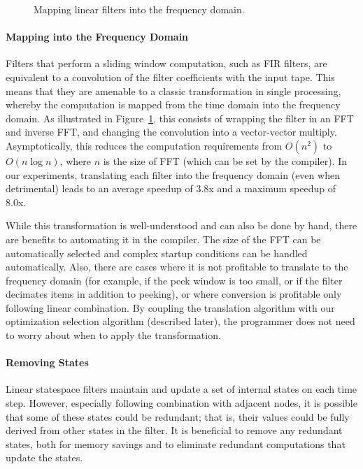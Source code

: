 \begin{figure}[t]
\caption{Mapping linear filters into the frequency domain.\protect\label{fig:freq}}
\end{figure}

\paragraph*{Mapping into the Frequency Domain}  Filters that perform a 
sliding window computation, such as FIR filters, are equivalent to a
convolution of the filter coefficients with the input tape.  This
means that they are amenable to a classic transformation in single
processing, whereby the computation is mapped from the time domain
into the frequency domain.  As illustrated in Figure~\ref{fig:freq},
this consists of wrapping the filter in an FFT and inverse FFT, and
changing the convolution into a vector-vector multiply.
Asymptotically, this reduces the computation requirements from
$O(n^2)$ to $O(n \log n)$, where $n$ is the size of FFT (which can be
set by the compiler).  In our experiments, translating each filter
into the frequency domain (even when detrimental) leads to an average
speedup of 3.8x and a maximum speedup of 8.0x.

While this transformation is well-understood and can also be done by
hand, there are benefits to automating it in the compiler.  The size
of the FFT can be automatically selected and complex startup
conditions can be handled automatically.  Also, there are cases where
it is not profitable to translate to the frequency domain (for
example, if the peek window is too small, or if the filter decimates
items in addition to peeking), or where conversion is profitable only
following linear combination.  By coupling the translation algorithm
with our optimization selection algorithm (described later), the
programmer does not need to worry about when to apply the
transformation.

\paragraph*{Removing States}  Linear statespace filters maintain and
update a set of internal states on each time step.  However,
especially following combination with adjacent nodes, it is possible
that some of these states could be redundant; that is, their values
could be fully derived from other states in the filter.  It is
beneficial to remove any redundant states, both for memory savings and
to eliminate redundant computations that update the states.

